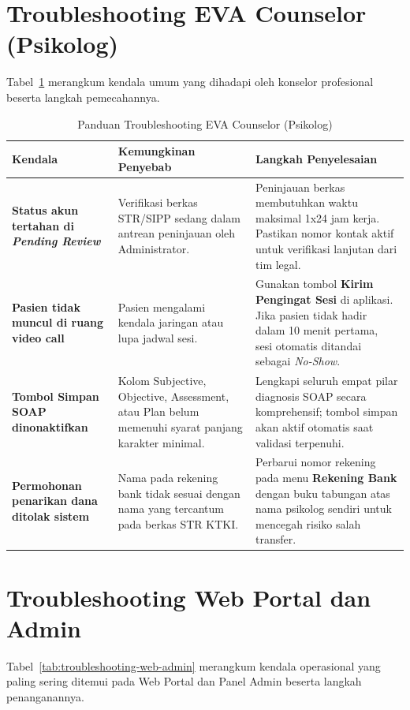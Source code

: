 \section{Troubleshooting EVA Counselor (Psikolog)}
Tabel~\ref{tab:troubleshooting-counselor} merangkum kendala umum yang dihadapi oleh konselor profesional beserta langkah pemecahannya.

\begin{table}[htbp]
  \centering
  \caption{Panduan Troubleshooting EVA Counselor (Psikolog)}
  \label{tab:troubleshooting-counselor}
  \small
  \begin{tabularx}{\textwidth}{@{}p{4.0cm}p{4.3cm}X@{}}
    \toprule
    \textbf{Kendala} & \textbf{Kemungkinan Penyebab} & \textbf{Langkah Penyelesaian} \\
    \midrule
    \textbf{Status akun tertahan di \textit{Pending Review}} & Verifikasi berkas STR/SIPP sedang dalam antrean peninjauan oleh Administrator. & Peninjauan berkas membutuhkan waktu maksimal 1x24 jam kerja. Pastikan nomor kontak aktif untuk verifikasi lanjutan dari tim legal. \\
    \addlinespace[4pt]
    \textbf{Pasien tidak muncul di ruang video call} & Pasien mengalami kendala jaringan atau lupa jadwal sesi. & Gunakan tombol \textbf{Kirim Pengingat Sesi} di aplikasi. Jika pasien tidak hadir dalam 10 menit pertama, sesi otomatis ditandai sebagai \textit{No-Show}. \\
    \addlinespace[4pt]
    \textbf{Tombol Simpan SOAP dinonaktifkan} & Kolom Subjective, Objective, Assessment, atau Plan belum memenuhi syarat panjang karakter minimal. & Lengkapi seluruh empat pilar diagnosis SOAP secara komprehensif; tombol simpan akan aktif otomatis saat validasi terpenuhi. \\
    \addlinespace[4pt]
    \textbf{Permohonan penarikan dana ditolak sistem} & Nama pada rekening bank tidak sesuai dengan nama yang tercantum pada berkas STR KTKI. & Perbarui nomor rekening pada menu \textbf{Rekening Bank} dengan buku tabungan atas nama psikolog sendiri untuk mencegah risiko salah transfer. \\
    \bottomrule
  \end{tabularx}
\end{table}

\section{Troubleshooting Web Portal dan Admin}
Tabel~\ref{tab:troubleshooting-web-admin} merangkum kendala operasional yang paling sering ditemui pada Web Portal dan Panel Admin beserta langkah penanganannya.

